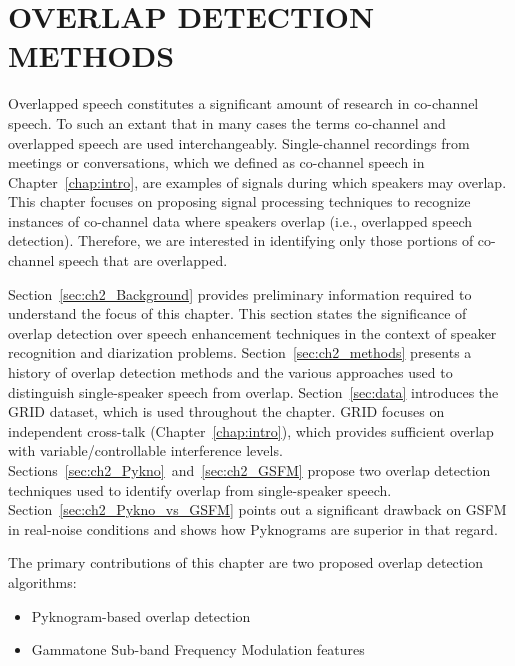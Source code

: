 

\chapter{OVERLAP DETECTION METHODS}
\label{chapter:front-end}
Overlapped speech constitutes a significant amount of research in co-channel speech. 
To such an extant that in many cases the terms co-channel and overlapped speech are used interchangeably. Single-channel recordings from meetings or conversations, which we defined as co-channel speech in Chapter~\ref{chap:intro}, are examples of signals during which speakers may overlap. 
This chapter focuses on proposing signal processing techniques to recognize instances of co-channel data where speakers overlap (i.e., overlapped speech detection). Therefore, we are interested in identifying only those portions of co-channel speech that are overlapped. 

Section~\ref{sec:ch2_Background} provides preliminary information required to understand the focus of this chapter. This section states the significance of overlap detection over speech enhancement techniques in the context of speaker recognition and diarization problems. 
Section~\ref{sec:ch2_methods} presents a history of overlap detection methods and the various approaches used to distinguish single-speaker speech from overlap. 
Section~\ref{sec:data} introduces the GRID dataset, which is used throughout the chapter. 
GRID focuses on independent cross-talk (Chapter~\ref{chap:intro}), which provides sufficient overlap with variable/controllable interference levels. 
Sections~\ref{sec:ch2_Pykno}~and~\ref{sec:ch2_GSFM} propose two overlap detection techniques used to identify overlap from single-speaker speech. 
Section~\ref{sec:ch2_Pykno_vs_GSFM} points out a significant drawback on GSFM in real-noise conditions and shows how Pyknograms are superior in that regard. 

The primary contributions of this chapter are two proposed overlap detection algorithms: 
\begin{itemize}
	\item Pyknogram-based overlap detection
	\item Gammatone Sub-band Frequency Modulation features
\end{itemize}

\newpage
